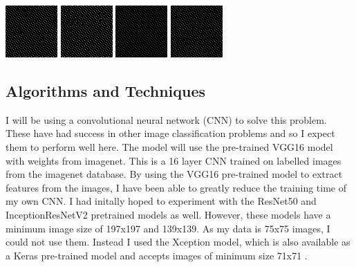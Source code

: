 \documentclass{article}
\begin{document}
\includegraphics[scale=1]{my_iceberg_band_1}
\includegraphics[scale=1]{my_iceberg_band_2}
\includegraphics[scale=1]{my_not_iceberg_band_1}
\includegraphics[scale=1]{my_not_iceberg_band_2}


 
\subsection{Algorithms and Techniques}
I will be using a convolutional neural network (CNN) to solve this problem. These have had success in other image classification problems and so I expect them to perform well here. The model will use the pre-trained VGG16 model with weights from imagenet. This is a 16 layer CNN trained on labelled images from the imagenet database. By using the VGG16 pre-trained model to extract features from the images, I have been able to greatly reduce the training time of my own CNN. I had initally hoped to experiment with the ResNet50 and InceptionResNetV2 pretrained models as well. However, these models have a minimum image size of 197x197 and 139x139. As my data is 75x75 images, I could not use them. Instead I used the Xception model, which is also available as a Keras pre-trained model and accepts images of minimum size 71x71 \citep{keras-layers}. 
\end{document}
